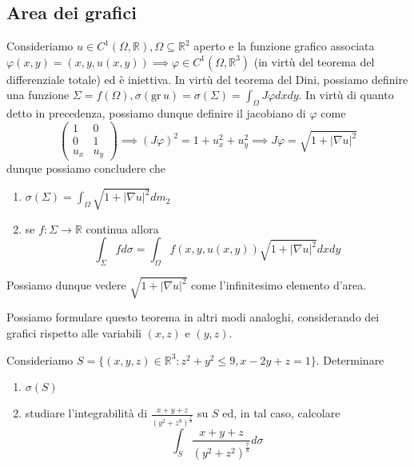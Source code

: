 \subsection{Area dei grafici}
Consideriamo $u \in C^1(\Omega, \mathbb{R}), \Omega \subseteq \mathbb{R}^2$ aperto e la funzione grafico associata $\varphi(x, y)=(x, y, u(x,y)) \implies \varphi \in C^1(\Omega, \mathbb{R}^3)$ (in virtù del teorema del differenziale totale) ed è iniettiva.
In virtù del teorema del Dini, possiamo definire una funzione $\Sigma=f(\Omega), \sigma(\text{gr} \, u) = \sigma(\Sigma) = \int_\Omega J\varphi dxdy$. In virtù di quanto detto in precedenza, possiamo dunque definire il jacobiano di $\varphi$ come
$$
\begin{pmatrix}
1 & 0 \\
0 & 1 \\
u_x & u_y
\end{pmatrix} \implies (J\varphi)^2 = 1 + u_x^2 + u_y^2 \implies J\varphi = \sqrt{1 + |\nabla u|^2}
$$
dunque possiamo concludere che
\begin{enumerate}[label=\protect\circled{\arabic*}]
	\item $\sigma(\Sigma) = \int_\Omega \sqrt{1 + |\nabla u|^2} dm_2$
	\item se $f: \Sigma \to \mathbb{R}$ continua allora
	$$
		\int_\Sigma f d\sigma = \int_\Omega f(x, y, u(x, y)) \sqrt{1 + |\nabla u|^2} dxdy
	$$
\end{enumerate}
\begin{remark}
	Possiamo dunque vedere $\sqrt{1 + |\nabla u|^2}$ come l'infinitesimo elemento d'area.
\end{remark}
\begin{remark}
	Possiamo formulare questo teorema in altri modi analoghi, considerando dei grafici rispetto alle variabili $(x, z)$ e $(y, z)$.
\end{remark}
\begin{example}
	Consideriamo $S=\{(x, y, z) \in \mathbb{R}^3: z^2 + y^2 \leq 9, x - 2y + z = 1 \}$. Determinare
	\begin{enumerate}[label=\protect\circled{\arabic*}]
		\item $\sigma(S)$
		\item studiare l'integrabilità di $\frac{x+y+z}{(y^2 + z^9)^{\frac{7}{8}}}$ su $S$ ed, in tal caso, calcolare
		$$
			\int_S \frac{x+y+z}{(y^2 + z^2)^{\frac{7}{8}}} d\sigma
		$$
	\end{enumerate}
\end{example}
